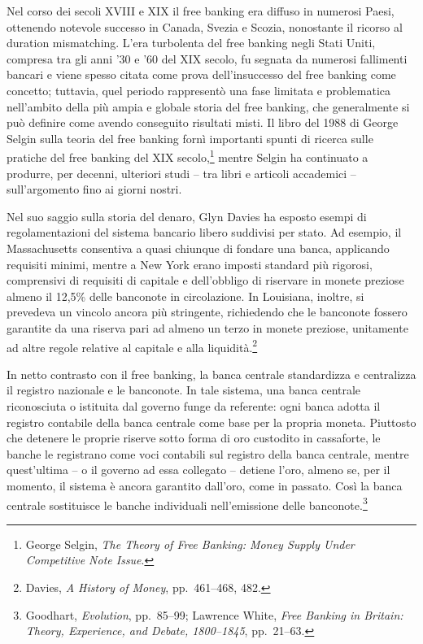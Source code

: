 \documentclass[
  a5paper,
  smalldemyvopaper,10pt,twoside,onecolumn,openright,extrafontsizes,hidelinks]{memoir}
\begin{document}
Nel corso dei secoli XVIII e XIX il free banking era diffuso in numerosi
Paesi, ottenendo notevole successo in Canada, Svezia e Scozia,
nonostante il ricorso al duration mismatching. L'era turbolenta del free
banking negli Stati Uniti, compresa tra gli anni '30 e '60 del XIX
secolo, fu segnata da numerosi fallimenti bancari e viene spesso citata
come prova dell'insuccesso del free banking come concetto; tuttavia,
quel periodo rappresentò una fase limitata e problematica nell'ambito
della più ampia e globale storia del free banking, che generalmente si
può definire come avendo conseguito risultati misti. Il libro del 1988
di George Selgin sulla teoria del free banking fornì importanti spunti
di ricerca sulle pratiche del free banking del XIX secolo,\footnote{George
  Selgin, \emph{The Theory of Free Banking: Money Supply Under
  Competitive Note Issue}.} mentre Selgin ha continuato a produrre, per
decenni, ulteriori studi -- tra libri e articoli accademici --
sull'argomento fino ai giorni nostri.

Nel suo saggio sulla storia del denaro, Glyn Davies ha esposto esempi di
regolamentazioni del sistema bancario libero suddivisi per stato. Ad
esempio, il Massachusetts consentiva a quasi chiunque di fondare una
banca, applicando requisiti minimi, mentre a New York erano imposti
standard più rigorosi, comprensivi di requisiti di capitale e
dell'obbligo di riservare in monete preziose almeno il 12,5\% delle
banconote in circolazione. In Louisiana, inoltre, si prevedeva un
vincolo ancora più stringente, richiedendo che le banconote fossero
garantite da una riserva pari ad almeno un terzo in monete preziose,
unitamente ad altre regole relative al capitale e alla
liquidità.\footnote{Davies, \emph{A History of Money}, pp.~461--468,
  482.}

In netto contrasto con il free banking, la banca centrale standardizza e
centralizza il registro nazionale e le banconote. In tale sistema, una
banca centrale riconosciuta o istituita dal governo funge da referente:
ogni banca adotta il registro contabile della banca centrale come base
per la propria moneta. Piuttosto che detenere le proprie riserve sotto
forma di oro custodito in cassaforte, le banche le registrano come voci
contabili sul registro della banca centrale, mentre quest'ultima -- o il
governo ad essa collegato -- detiene l'oro, almeno se, per il momento,
il sistema è ancora garantito dall'oro, come in passato. Così la banca
centrale sostituisce le banche individuali nell'emissione delle
banconote.\footnote{Goodhart, \emph{Evolution}, pp.~85--99; Lawrence
  White, \emph{Free Banking in Britain: Theory, Experience, and Debate,
  1800--1845}, pp.~21--63.}
\end{document}
